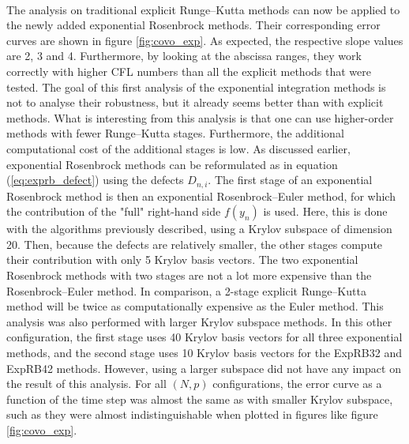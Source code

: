       \paragraph{}
      The analysis on traditional explicit Runge--Kutta methods can now be applied to the newly added exponential Rosenbrock methods.
      Their corresponding error curves are shown in figure \ref{fig:covo_exp}.
      As expected, the respective slope values are 2, 3 and 4.
      Furthermore, by looking at the abscissa ranges, they work correctly with higher CFL numbers than all the explicit methods that were tested.
      The goal of this first analysis of the exponential integration methods is not to analyse their robustness, but it already seems better than with explicit methods.
      What is interesting from this analysis is that one can use higher-order methods with fewer Runge--Kutta stages.
      Furthermore, the additional computational cost of the additional stages is low.
      As discussed earlier, exponential Rosenbrock methods can be reformulated as in equation (\ref{eq:exprb_defect}) using the defects $D_{n, i}$.
      The first stage of an exponential Rosenbrock method is then an exponential Rosenbrock--Euler method, for which the contribution of the "full" right-hand side $f\left(y_n\right)$ is used.
      Here, this is done with the algorithms previously described, using a Krylov subspace of dimension 20.
      Then, because the defects are relatively smaller, the other stages compute their contribution with only 5 Krylov basis vectors.
      The two exponential Rosenbrock methods with two stages are not a lot more expensive than the Rosenbrock--Euler method.
      In comparison, a 2-stage explicit Runge--Kutta method will be twice as computationally expensive as the Euler method.
      This analysis was also performed with larger Krylov subspace methods.
      In this other configuration, the first stage uses 40 Krylov basis vectors for all three exponential methods, and the second stage uses 10 Krylov basis vectors for the ExpRB32 and ExpRB42 methods.
      However, using a larger subspace did not have any impact on the result of this analysis.
      For all $\left(N, p\right)$ configurations, the error curve as a function of the time step was almost the same as with smaller Krylov subspace, such as they were almost indistinguishable when plotted in figures like figure \ref{fig:covo_exp}.

